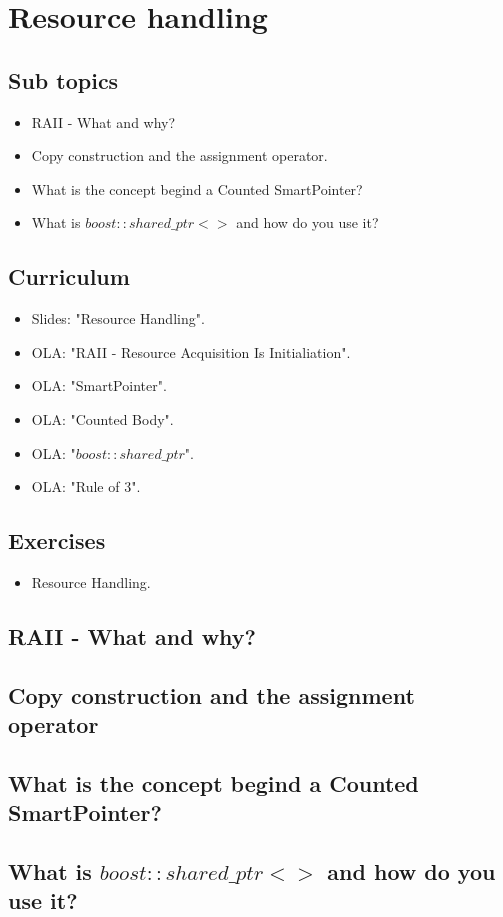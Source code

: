 \section{Resource handling}

\subsection{Sub topics}

\begin{itemize}
	\item RAII - What and why?
	\item Copy construction and the assignment operator.
	\item What is the concept begind a Counted SmartPointer?
	\item What is $boost::shared\_ptr<>$ and how do you use it?
\end{itemize}

\subsection{Curriculum}

\begin{itemize}
	\item Slides: "Resource Handling".
	\item OLA: "RAII - Resource Acquisition Is Initialiation".
	\item OLA: "SmartPointer".
	\item OLA: "Counted Body".
	\item OLA: "$boost::shared\_ptr$".
	\item OLA: "Rule of 3".
\end{itemize}

\subsection{Exercises}

\begin{itemize}
	\item Resource Handling.
\end{itemize}

\subsection{RAII - What and why?}

\subsection{Copy construction and the assignment operator}

\subsection{What is the concept begind a Counted SmartPointer?}

\subsection{What is $boost::shared\_ptr<>$ and how do you use it?}